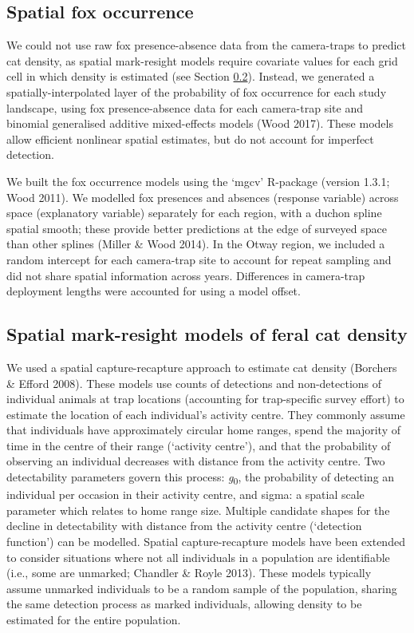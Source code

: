 \documentclass[]{elsarticle} %
\begin{document}
\hypertarget{density-methods-fox}{%
\subsection{Spatial fox occurrence}\label{density-methods-fox}}

We could not use raw fox presence-absence data from the camera-traps to predict cat density, as spatial mark-resight models require covariate values for each grid cell in which density is estimated (see Section \ref{density-methods-smr}). Instead, we generated a spatially-interpolated layer of the probability of fox occurrence for each study landscape, using fox presence-absence data for each camera-trap site and binomial generalised additive mixed-effects models (Wood 2017). These models allow efficient nonlinear spatial estimates, but do not account for imperfect detection.

We built the fox occurrence models using the `mgcv' R-package (version 1.3.1; Wood 2011). We modelled fox presences and absences (response variable) across space (explanatory variable) separately for each region, with a duchon spline spatial smooth; these provide better predictions at the edge of surveyed space than other splines (Miller \& Wood 2014). In the Otway region, we included a random intercept for each camera-trap site to account for repeat sampling and did not share spatial information across years. Differences in camera-trap deployment lengths were accounted for using a model offset.

\hypertarget{density-methods-smr}{%
\subsection{Spatial mark-resight models of feral cat density}\label{density-methods-smr}}

We used a spatial capture-recapture approach to estimate cat density (Borchers \& Efford 2008). These models use counts of detections and non-detections of individual animals at trap locations (accounting for trap-specific survey effort) to estimate the location of each individual's activity centre. They commonly assume that individuals have approximately circular home ranges, spend the majority of time in the centre of their range (`activity centre'), and that the probability of observing an individual decreases with distance from the activity centre. Two detectability parameters govern this process: \emph{g}\textsubscript{0}, the probability of detecting an individual per occasion in their activity centre, and sigma: a spatial scale parameter which relates to home range size. Multiple candidate shapes for the decline in detectability with distance from the activity centre (`detection function') can be modelled. Spatial capture-recapture models have been extended to consider situations where not all individuals in a population are identifiable (i.e., some are unmarked; Chandler \& Royle 2013). These models typically assume unmarked individuals to be a random sample of the population, sharing the same detection process as marked individuals, allowing density to be estimated for the entire population.
\end{document}
